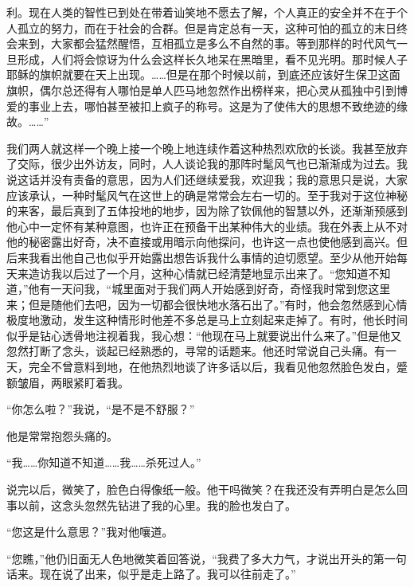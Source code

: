 利。现在人类的智性已到处在带着讪笑地不愿去了解，个人真正的安全并不在于个人孤立的努力，而在于社会的合群。但是肯定总有一天，这种可怕的孤立的末日终会来到，大家都会猛然醒悟，互相孤立是多么不自然的事。等到那样的时代风气一旦形成，人们将会惊讶为什么会这样长久地呆在黑暗里，看不见光明。那时候人子耶稣的旗帜就要在天上出现。……但是在那个时候以前，到底还应该好生保卫这面旗帜，偶尔总还得有人哪怕是单人匹马地忽然作出榜样来，把心灵从孤独中引到博爱的事业上去，哪怕甚至被扣上疯子的称号。这是为了使伟大的思想不致绝迹的缘故。……”
\par 我们两人就这样一个晚上接一个晚上地连续作着这种热烈欢欣的长谈。我甚至放弃了交际，很少出外访友，同时，人人谈论我的那阵时髦风气也已渐渐成为过去。我说这话并没有责备的意思，因为人们还继续爱我，欢迎我；我的意思只是说，大家应该承认，一种时髦风气在这世上的确是常常会左右一切的。至于我对于这位神秘的来客，最后真到了五体投地的地步，因为除了钦佩他的智慧以外，还渐渐预感到他心中一定怀有某种意图，也许正在预备干出某种伟大的业绩。我在外表上从不对他的秘密露出好奇，决不直接或用暗示向他探问，也许这一点也使他感到高兴。但后来我看出他自己也似乎开始露出想告诉我什么事情的迫切愿望。至少从他开始每天来造访我以后过了一个月，这种心情就已经清楚地显示出来了。“您知道不知道，”他有一天问我，“城里面对于我们两人开始感到好奇，奇怪我时常到您这里来；但是随他们去吧，因为一切都会很快地水落石出了。”有时，他会忽然感到心情极度地激动，发生这种情形时他差不多总是马上立刻起来走掉了。有时，他长时间似乎是钻心透骨地注视着我，我心想：“他现在马上就要说出什么来了。”但是他又忽然打断了念头，谈起已经熟悉的，寻常的话题来。他还时常说自己头痛。有一天，完全不曾意料到地，在他热烈地谈了许多话以后，我看见他忽然脸色发白，蹙额皱眉，两眼紧盯着我。
\par “你怎么啦？”我说，“是不是不舒服？”
\par 他是常常抱怨头痛的。
\par “我……你知道不知道……我……杀死过人。”
\par 说完以后，微笑了，脸色白得像纸一般。他干吗微笑？在我还没有弄明白是怎么回事以前，这念头忽然先钻进了我的心里。我的脸也发白了。
\par “您这是什么意思？”我对他嚷道。
\par “您瞧，”他仍旧面无人色地微笑着回答说，“我费了多大力气，才说出开头的第一句话来。现在说了出来，似乎是走上路了。我可以往前走了。”
